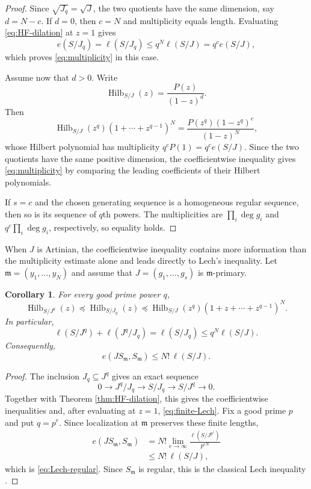 \documentclass[11pt]{amsart}
\newtheorem{corollary}[theorem]{Corollary}
\theoremstyle{remark}
\newcommand{\Hilb}{\operatorname{Hilb}}
\begin{document}
\begin{proof}
Since $\sqrt{J_q}=\sqrt J$, the two quotients have the same dimension, say $d=N-c$. If $d=0$, then $c=N$ and multiplicity equals length. Evaluating \eqref{eq:HF-dilation} at $z=1$ gives
$$
e(S/J_q)=\ell(S/J_q)\le q^N\ell(S/J)=q^ce(S/J),
$$
which proves \eqref{eq:multiplicity} in this case.

Assume now that $d>0$. Write
$$
\Hilb_{S/J}(z)=\frac{P(z)}{(1-z)^d}.
$$
Then
$$
\Hilb_{S/J}(z^q)(1+\cdots+z^{q-1})^N
=
\frac{P(z^q)(1-z^q)^c}{(1-z)^N},
$$
whose Hilbert polynomial has multiplicity $q^cP(1)=q^ce(S/J)$. Since the two quotients have the same positive dimension, the coefficientwise inequality gives \eqref{eq:multiplicity} by comparing the leading coefficients of their Hilbert polynomials.

If $s=c$ and the chosen generating sequence is a homogeneous regular sequence, then so is its sequence of $q$th powers. The multiplicities are $\prod_i\deg g_i$ and $q^c\prod_i\deg g_i$, respectively, so equality holds.
\end{proof}


When $J$ is Artinian, the coefficientwise inequality contains more information than the multiplicity estimate alone and leads directly to Lech's inequality. Let $\mathfrak m=(y_1,\ldots,y_N)$ and assume that $J=(g_1,\ldots,g_s)$ is $\mathfrak m$-primary.

\begin{corollary}\label{cor:Lech}
For every good prime power $q$,
$$
\Hilb_{S/J^q}(z)
\preceq
\Hilb_{S/J_q}(z)
\preceq
\Hilb_{S/J}(z^q)(1+z+\cdots+z^{q-1})^N.
$$
In particular,
\begin{equation}\label{eq:finite-Lech}
\ell(S/J^q)+\ell(J^q/J_q)
=\ell(S/J_q)
\le q^N\ell(S/J).
\end{equation}
Consequently,
\begin{equation}\label{eq:Lech-regular}
e(JS_{\mathfrak m},S_{\mathfrak m})
\le N!\,\ell(S/J).
\end{equation}
\end{corollary}

\begin{proof}
The inclusion $J_q\subseteq J^q$ gives an exact sequence
$$
0\longrightarrow J^q/J_q
\longrightarrow S/J_q
\longrightarrow S/J^q
\longrightarrow0.
$$
Together with Theorem \ref{thm:HF-dilation}, this gives the coefficientwise inequalities and, after evaluating at $z=1$, \eqref{eq:finite-Lech}. Fix a good prime $p$ and put $q=p^e$. Since localization at $\mathfrak m$ preserves these finite lengths,
$$
\begin{aligned}
e(JS_{\mathfrak m},S_{\mathfrak m})
&=N!\lim_{e\to\infty}
\frac{\ell(S/J^{p^e})}{p^{eN}}\\
&\le N!\,\ell(S/J),
\end{aligned}
$$
which is \eqref{eq:Lech-regular}. Since $S_{\mathfrak m}$ is regular, this is the classical Lech inequality \cite{Lech}.
\end{proof}
\end{document}
